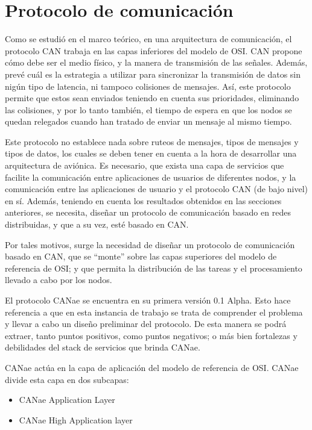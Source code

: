 \section{Protocolo de comunicación}\label{sec:protocolo_communicacion}
Como se estudió en el marco teórico, en una arquitectura
de comunicación, el protocolo CAN trabaja en las
capas inferiores del modelo de OSI. CAN propone cómo debe ser
el medio físico, y la manera de transmisión de las señales.
Además, prevé cuál es la estrategia a utilizar  para sincronizar
la transmisión de datos sin nigún tipo de latencia, ni tampoco
colisiones de mensajes. Así, este protocolo permite que estos
sean enviados teniendo en cuenta sus prioridades, eliminando las colisiones, y
por lo tanto también, el tiempo de espera en que los nodos se quedan
relegados cuando han tratado de enviar un mensaje al mismo tiempo.

Este protocolo no establece nada sobre ruteos de mensajes, tipos de mensajes y
tipos de datos, los cuales se deben tener en cuenta a la hora de desarrollar una arquitectura de aviónica.
Es necesario, que exista una
capa de servicios que facilite la comunicación entre aplicaciones de usuarios
de diferentes nodos, y la comunicación entre las aplicaciones de usuario
y el protocolo CAN (de bajo nivel) en sí.
Además, teniendo en cuenta los resultados obtenidos en las secciones
anteriores, se necesita, diseñar un protocolo de comunicación
basado en redes distribuidas, y que a su vez, esté basado en CAN.

Por tales motivos, surge la necesidad
de diseñar un protocolo de comunicación basado en CAN, que se ``monte'' sobre
las capas superiores del modelo de referencia de OSI; y que permita
la distribución de las tareas y el procesamiento llevado a cabo
por los nodos. 

El protocolo CANae se encuentra en su primera versión 0.1 Alpha. Esto hace
referencia a que en esta instancia de trabajo se trata de comprender
el problema y llevar a cabo un diseño preliminar del protocolo. De esta
manera se podrá extraer, tanto puntos positivos, como puntos negativos; o
más bien fortalezas y debilidades del stack de servicios que brinda CANae.

CANae actúa en la capa de aplicación del modelo de referencia de OSI. CANae
divide esta capa en dos subcapas:
\begin{itemize}
\item CANae Application Layer
\item CANae High Application layer
\end{itemize}

